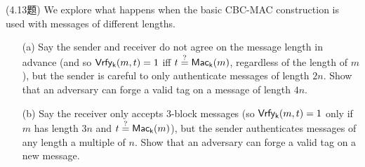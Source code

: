 \begin{questions}
    \question (4.13题) We explore what happens when the basic CBC-MAC construction is used with messages of different lengths.

        \begin{enumerate}
            \item[(a)] Say the sender and receiver do not agree on the message length in advance (and so $\mathsf{Vrfy_k}(m,t)=1$ iff $t\overset{?}{=}\mathsf{Mac_k}(m)$, regardless of the length of $m$), but the sender is careful to only authenticate messages of length $2n$. Show that an adversary can forge a valid tag on a message of length $4n$.
            \item[(b)] Say the receiver only accepts 3-block messages (so $\mathsf{Vrfy_k}(m,t)=1$ only if $m$ has length $3n$ and $t\overset{?}{=}\mathsf{Mac_k}(m)$), but the sender authenticates messages of any length a multiple of $n$. Show that an adversary can forge a valid tag on a new message.
        \end{enumerate}


\end{questions}
